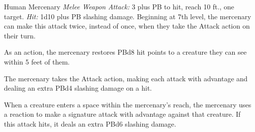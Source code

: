 \documentclass[10pt,a4paper,twoside,bg=print,twocolumn,openany,nodeprecatedcode]{dndbook}
\begin{document}
\begin{DndMonster}[float=t]{Human Mercenary}
\DndMonsterBasics[
armor-class = {15 (medium armor)},
hit-points = {\DndDice{Nine times their level (number of d12 Hit Dice equal to their level)}},
speed = {30 ft.}
]
\DndMonsterAbilityScores[
 str = 16,
 dex = 10,
 con = 14,
 int = 10,
 wis = 10,
 cha = 10
]
\DndMonsterDetails[
saving-throws = {Str +PB, Dex +PB, Con +PB, Int +PB, Wis +PB, Cha +PB},
skills = {Athletics +3 plus PB, Medicine +0 plus PB, Perception +0 plus PB},
languages = {Common},
]
\textsl{Melee Weapon Attack:} 3 plus PB to hit, reach 10 ft., one target. \textsl{Hit:} 1d10 plus PB slashing damage. Beginning at 7th level, the mercenary can make this attack twice, instead of once, when they take the Attack action on their turn.

As an action, the mercenary restores PBd8 hit points to a creature they can see within 5 feet of them.

The mercenary takes the Attack action, making each attack with advantage and dealing an extra PBd4 slashing damage on a hit.

When a creature enters a space within the mercenary's reach, the mercenary uses a reaction to make a signature attack with advantage against that creature. If this attack hits, it deals an extra PBd6 slashing damage.

\end{DndMonster}
\end{document}
